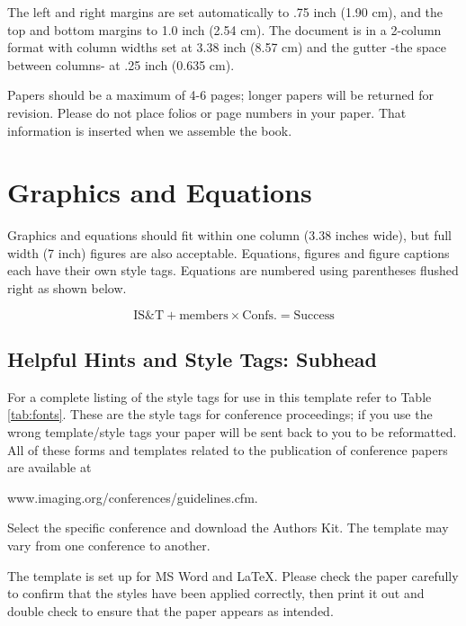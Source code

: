 \documentclass[letterpaper,twocolumn,fleqn]{article}
\begin{document}
The left and right margins are set automatically to .75 inch (1.90 cm),
and the top and bottom margins to 1.0 inch (2.54 cm). The document is in
a 2-column format with column widths set at 3.38 inch (8.57 cm) and the
gutter -the space between columns- at .25 inch (0.635 cm).

Papers should be a maximum of 4-6 pages; longer papers will be
returned for revision. Please do not place folios or page numbers in
your paper. That information is inserted when we assemble the book.


\section{Graphics and Equations}
Graphics and equations should fit within one column (3.38 inches
wide), but full width (7 inch) figures are also acceptable. Equations,
figures and figure captions each have their own style tags. Equations
are numbered using parentheses flushed right as shown below.

\begin{equation}
\label{eq:ist}
\textrm{IS\&T} + \textrm{members} \times \textrm{Confs.} = \textrm{Success}
\end{equation}


\subsection{Helpful Hints and Style Tags: Subhead}
For a complete listing of the style tags for use in this template
refer to Table \ref{tab:fonts}. These are the style tags for
conference proceedings; if you use the wrong template/style tags your
paper will be sent back to you to be reformatted.  All of these forms
and templates related to the publication of conference papers are
available at

www.imaging.org/conferences/guidelines.cfm. 

Select the specific conference and download the Authors Kit. The
template may vary from one conference to another.

The template is set up for MS Word and LaTeX. Please check the paper
carefully to confirm that the styles have been applied correctly, then
print it out and double check to ensure that the paper appears as
intended.
\end{document}
